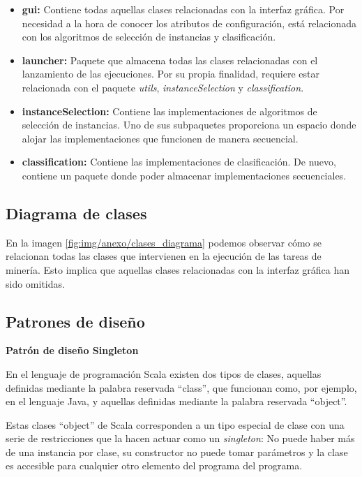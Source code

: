 
\begin{itemize}
\item \textbf{gui:} Contiene todas aquellas clases relacionadas con la interfaz gráfica. Por necesidad a la hora de conocer los atributos de configuración, está relacionada con los algoritmos de selección de instancias y clasificación.
\item \textbf{launcher:} Paquete que almacena todas las clases relacionadas con el lanzamiento de las ejecuciones. Por su propia finalidad, requiere estar relacionada con el paquete \textit{utils}, \textit{instanceSelection} y \textit{classification}.
\item \textbf{instanceSelection:} Contiene las implementaciones de algoritmos de selección de instancias. Uno de sus subpaquetes proporciona un espacio donde alojar las implementaciones que funcionen de manera secuencial.
\item \textbf{classification:} Contiene las implementaciones de clasificación. De nuevo, contiene un paquete donde poder almacenar implementaciones secuenciales.
\end{itemize}

\subsection{Diagrama de clases}

En la imagen \ref{fig:img/anexo/clases_diagrama} podemos observar cómo se relacionan todas las clases que intervienen en la ejecución de las tareas de minería. Esto implica que aquellas clases relacionadas con la interfaz gráfica han sido omitidas.



\subsection{Patrones de diseño}

\textbf{Patrón de diseño Singleton}

En el lenguaje de programación Scala existen dos tipos de clases, aquellas definidas mediante la palabra reservada ``class'', que funcionan como, por ejemplo, en el lenguaje Java, y aquellas definidas mediante la palabra reservada ``object''.

Estas clases ``object'' de Scala corresponden a un tipo especial de clase con una serie de restricciones que la hacen actuar como un \textit{singleton}: No puede haber más de una instancia por clase, su constructor no puede tomar parámetros y la clase es accesible para cualquier otro elemento del programa del programa.

